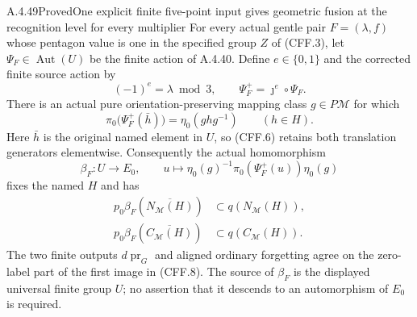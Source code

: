 \begin{result}{A.4.49}{Proved}{One explicit finite five-point input gives geometric fusion at the recognition level for every multiplier}
For every actual gentle pair $F=(\lambda,f)$ whose pentagon value is
one in the specified group $Z$ of (CFF.3), let $\Psi_F\in\operatorname{Aut}(U)$
be the finite action of A.4.40.  Define $e\in\{0,1\}$ and the corrected
finite source action by
\[
 (-1)^e=\lambda\bmod3,\qquad
 \Psi_F^+=\jmath^e\circ\Psi_F .
                                                               \tag{CFF.5}
\]
There is an actual pure orientation-preserving mapping class
$g\in P\mathcal M$ for which
\[
       \pi_0\bigl(\Psi_F^+(\bar h)\bigr)
                    =\eta_0(g h g^{-1})\qquad(h\in H).
                                                               \tag{CFF.6}
\]
Here $\bar h$ is the original named element in $U$, so (CFF.6)
retains both translation generators elementwise.
Consequently the actual homomorphism
\[
 \beta_F:U\longrightarrow E_0,\qquad
 u\longmapsto\eta_0(g)^{-1}\pi_0(\Psi_F^+(u))\eta_0(g)
                                                               \tag{CFF.7}
\]
fixes the named $H$ and has
\[
 \begin{split}
 p_0\beta_F(\overline{N_{\mathcal M}(H)})
                       &\subset q(N_{\mathcal M}(H)),\\
 p_0\beta_F(\overline{C_{\mathcal M}(H)})
                       &\subset q(C_{\mathcal M}(H)).
 \end{split}                                                   \tag{CFF.8}
\]
The two finite outputs $d\operatorname{pr}_G$ and aligned ordinary
forgetting agree on the zero-label part of the first image in
(CFF.8).  The source of $\beta_F$ is the displayed universal finite
group $U$; no assertion that it descends to an automorphism of
$E_0$ is required.
\end{result}

